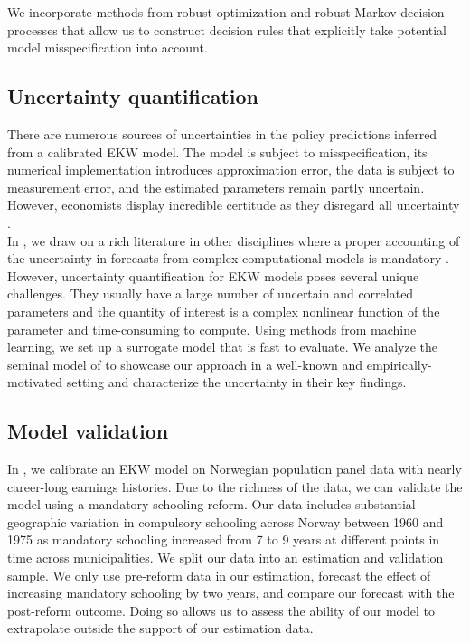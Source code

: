 \noindent We incorporate methods from robust optimization \citep{Ben-Tal.2009,Rahimian.2019,Wiesemann.2014} and robust Markov decision processes \citep{Iyengar.2005,Nilim.2005} that allow us to construct decision rules that explicitly take potential model misspecification into account.
\subsection{Uncertainty quantification}
There are numerous sources of uncertainties in the policy predictions inferred from a calibrated EKW model. The model is subject to misspecification, its numerical implementation introduces approximation error, the data is subject to measurement error, and the estimated parameters remain partly uncertain. However, economists display incredible certitude as they disregard all uncertainty \citep{Manski.2013}.\\

\noindent In \citet{Gabler.2020b}, we draw on a rich literature in other disciplines where a proper accounting of the uncertainty in forecasts from complex computational models is mandatory \citep{Saltelli.2004, Saltelli.2008, Smith.2014}. However, uncertainty quantification for EKW models poses several unique challenges. They usually have a large number of uncertain and correlated parameters and the quantity of interest is a complex nonlinear function of the parameter and time-consuming to compute. Using methods from machine learning, we set up a surrogate model that is fast to evaluate. We analyze the seminal model of \citep{Keane.1994, Keane.1997} to showcase our approach in a well-known and empirically-motivated setting and characterize the uncertainty in their key findings.
\subsection{Model validation}
In \citet{Bhuller.2018}, we calibrate an EKW model on Norwegian population panel data with nearly career-long earnings histories. Due to the richness of the data, we can validate the model using a mandatory schooling reform. Our data includes substantial geographic variation in compulsory schooling across Norway between 1960 and 1975 as mandatory schooling increased from 7 to 9 years at different points in time across municipalities. We split our data into an estimation and validation sample. We only use pre-reform data in our estimation, forecast the effect of increasing mandatory schooling by two years, and compare our forecast with the post-reform outcome. Doing so allows us to assess the ability of our model to extrapolate outside the support of our estimation data.\\

